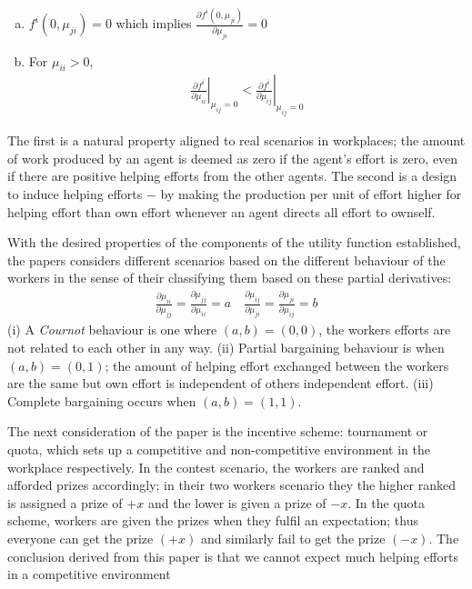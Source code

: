 \documentclass[a4paper,10pt]{article}
\theoremstyle{definition}
\begin{document}

\begin{enumerate}[(a)]
\item $f^i(0,\mu_{ji})=0$ which implies $\frac{\partial f^i(0,\mu_{ji})}{\partial \mu_{ji}}=0$
\item For $\mu_{ii}>0$,
\begin{align*}
\left.\frac{\partial f^i}{\partial \mu_{ii}}\right|_{\mu_{ij}=0} < \left.\frac{\partial f^i}{\partial \mu_{ij}}\right|_{\mu_{ij}=0}
\end{align*}
\end{enumerate}
The first is a natural property aligned to real scenarios in workplaces; the amount of work produced by an agent is deemed as zero if the agent's effort is zero, even if there are positive helping efforts from the other agents. The second is a design to induce helping efforts $-$ by making the production per unit of effort higher for helping effort than own effort whenever an agent directs all effort to ownself.

With the desired properties of the components of the utility function established,  the papers considers different scenarios based on the different behaviour of the workers in the sense of their classifying them based on these partial derivatives:
\begin{align}
\frac{\partial\mu_{ii}}{\partial\mu_{jj}}=\frac{\partial\mu_{jj}}{\partial\mu_{ii}}=a\quad
\frac{\partial\mu_{ij}}{\partial\mu_{ji}}=\frac{\partial\mu_{ji}}{\partial\mu_{ij}}=b \label{eq:partiald}
\end{align}
(i) A \emph{Cournot} behaviour is one where $(a,b)=(0,0)$, the workers efforts are not related to each other in any way. (ii) Partial bargaining behaviour is when $(a,b)=(0,1)$; the amount of helping effort exchanged between the workers are the same but own effort is independent of others independent effort. (iii) Complete bargaining occurs when $(a,b)=(1,1)$.


The next consideration of the paper is the incentive scheme: tournament or quota, which sets up a competitive and non-competitive environment in the workplace respectively. In the contest scenario, the workers are ranked and afforded prizes accordingly; in their two workers scenario they the higher ranked is assigned a prize of $+x$ and the lower is given a prize of $-x$. In the quota scheme, workers are given the prizes when they fulfil an expectation; thus everyone can get the prize $(+x)$ and similarly fail to get the prize $(-x)$. The conclusion derived from this paper is that we cannot expect much helping efforts in a competitive environment 
\end{document}
